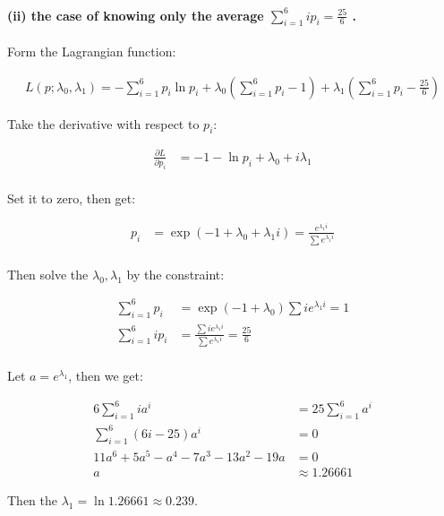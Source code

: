 \hypertarget{ii-the-case-of-knowing-only-the-average-sum_i16ip_ifrac256-.}{%
\paragraph{\texorpdfstring{(ii) the case of knowing only the average
\(\sum_{i=1}^6ip_i=\frac{25}6\)
.}{(ii) the case of knowing only the average \textbackslash sum\_\{i=1\}\^{}6ip\_i=\textbackslash frac\{25\}6 .}}\label{ii-the-case-of-knowing-only-the-average-sum_i16ip_ifrac256-.}}

Form the Lagrangian function:

\[
\begin{aligned}
L(p;\lambda_0,\lambda_1)=-\sum_{i=1}^6p_i\ln{p_i}
+\lambda_0\left(\sum_{i=1}^6p_i-1\right)+\lambda_1\left(\sum_{i=1}^6p_i-\frac{25}6\right)
\end{aligned}
\]

Take the derivative with respect to \(p_i\):

\[
\begin{aligned}
\frac{\partial L}{\partial p_i}
&=-1-\ln{p_i}+\lambda_0+i\lambda_1\\
\end{aligned}
\]

Set it to zero, then get:

\[
\begin{aligned}
p_i&=\exp(-1+\lambda_0+\lambda_1i)=\frac{e^{\lambda_1i}}{\sum e^{\lambda_1i}}\\
\end{aligned}
\]

Then solve the \(\lambda_0,\lambda_1\) by the constraint:

\[
\begin{aligned}
\sum_{i=1}^6p_i&=\exp(-1+\lambda_0)\sum ie^{\lambda_1i}=1\\
\sum_{i=1}^6ip_i&=\frac{\sum ie^{\lambda_1i}}{\sum e^{\lambda_1i}}=\frac{25}6\\
\end{aligned}
\]

Let \(a=e^{\lambda_1}\), then we get:

\[
\begin{aligned}
6\sum_{i=1}^6ia^i&=25\sum_{i=1}^6a^i\\
\sum_{i=1}^6 (6i-25)a^i&=0\\
11 a^6 + 5 a^5 - a^4 - 7 a^3 - 13 a^2 - 19 a &= 0\\
a&\approx 1.26661
\end{aligned}
\]

Then the \(\lambda_1=\ln1.26661\approx0.239\).

